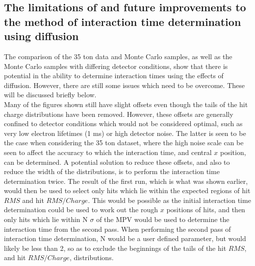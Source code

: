 \subsection{The limitations of and future improvements to the method of interaction time determination using diffusion} \label{sec:DiffLimitations}
The comparison of the 35 ton data and Monte Carlo samples, as well as the Monte Carlo samples with differing detector conditions, show that there is potential in the ability to determine interaction times using the effects of diffusion. However, there are still some issues which need to be overcome. These will be discussed briefly below. \\

Many of the figures shown still have slight offsets even though the tails of the hit charge distributions have been removed. However, these offsets are generally confined to detector conditions which would not be considered optimal, such as very low electron lifetimes (1 ms) or high detector noise. The latter is seen to be the case when considering the 35 ton dataset, where the high noise scale can be seen to affect the accuracy to which the interaction time, and central $x$ position, can be determined. A potential solution to reduce these offsets, and also to reduce the width of the distributions, is to perform the interaction time determination twice. The result of the first run, which is what was shown earlier, would then be used to select only hits which lie within the expected regions of hit $RMS$ and hit $RMS/Charge$. This would be possible as the initial interaction time determination could be used to work out the rough $x$ positions of hits, and then only hits which lie within N $\sigma$ of the MPV would be used to determine the interaction time from the second pass. When performing the second pass of interaction time determination, N would be a user defined parameter, but would likely be less than 2, so as to exclude the beginnings of the tails of the hit $RMS$, and hit $RMS/Charge$, distributions. \\

